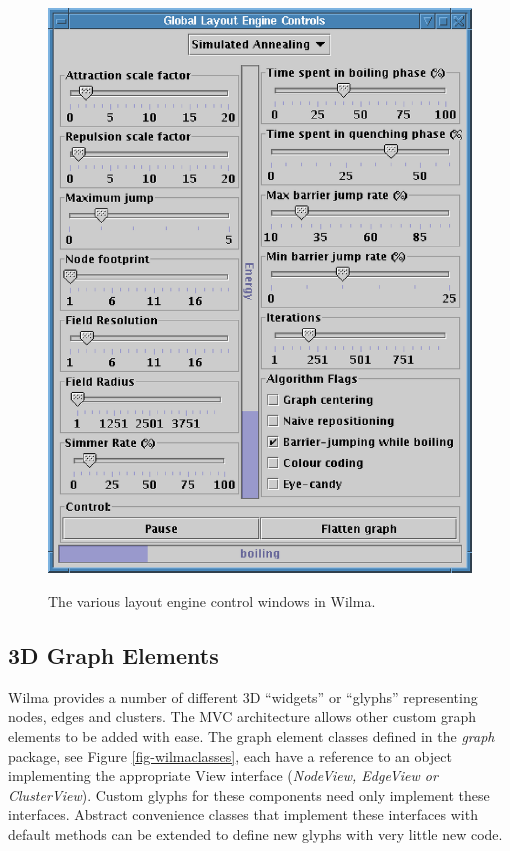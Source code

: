 \documentclass[runningheads]{cl2emult}
\begin{document}
\begin{figure}
{{    \includegraphics{figures/wilma-simannealcontrols.eps}}}
  \caption{The various layout engine control windows in Wilma.}
\end{figure}

\subsection{3D Graph Elements}
Wilma provides a number of different 3D ``widgets'' or ``glyphs''
representing nodes, edges and clusters.
The MVC architecture allows other custom graph elements to be added
with ease.  The graph element classes defined in the {\em graph}
package, see Figure \ref{fig-wilmaclasses}, each have a reference to
an object implementing the appropriate View interface ({\em NodeView, EdgeView or ClusterView}).
Custom glyphs for these components need only implement these
interfaces.  Abstract convenience classes that implement these
interfaces with default methods can be extended to define new glyphs
with very little new code.
\end{document}
